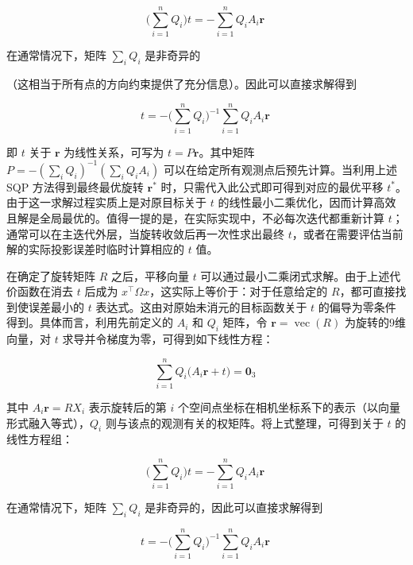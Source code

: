 \begin{equation} 
	\Big(\sum_{i=1}^n Q_i\Big)  t = - \sum_{i=1}^n Q_i A_i \mathbf{r}~
\end{equation}

在通常情况下，矩阵 $\sum_i Q_i$ 是非奇异的​

（这相当于所有点的方向约束提供了充分信息）。因此可以直接求解得到

\begin{equation} 
	t = -\Big(\sum_{i=1}^n Q_i\Big)^{-1} \sum_{i=1}^n Q_i A_i \mathbf{r}~  
\end{equation}

即 $t$ 关于 $\mathbf{r}$ 为线性关系，可写为 $t = P \mathbf{r}$​。其中矩阵 $P = -(\sum_i Q_i)^{-1}(\sum_i Q_i A_i)$ 可以在给定所有观测点后预先计算。当利用上述 SQP 方法得到最终最优旋转 $\mathbf{r}^*$ 时，只需代入此公式即可得到对应的最优平移 $t^*$。由于这一求解过程实质上是对原目标关于 $t$ 的线性最小二乘优化，因而计算高效且解是全局最优的。值得一提的是，在实际实现中，不必每次迭代都重新计算 $t$；通常可以在主迭代外层，当旋转收敛后再一次性求出最终 $t$，或者在需要评估当前解的实际投影误差时临时计算相应的 $t$ 值。

在确定了旋转矩阵 $R$ 之后，平移向量 $t$ 可以通过最小二乘闭式求解。由于上述代价函数在消去 $t$ 后成为 $x^\top \Omega x$，这实际上等价于：对于任意给定的 $R$，都可直接找到使误差最小的 $t$ 表达式。这由对原始未消元的目标函数关于 $t$ 的偏导为零条件得到。具体而言，利用先前定义的 $A_i$ 和 $Q_i$ 矩阵，令 $\mathbf{r} = \operatorname{vec}(R)$ 为旋转的9维向量，对 $t$ 求导并令梯度为零，可得到如下线性方程：

\begin{equation}
	\sum_{i=1}^n Q_i  \big(A_i \mathbf{r} + t\big) = \mathbf{0}_3~
\end{equation}

其中 $A_i   \mathbf{r} = R X_i$ 表示旋转后的第 $i$ 个空间点坐标在相机坐标系下的表示（以向量形式融入等式），$Q_i$ 则与该点的观测有关的权矩阵。将上式整理，可得到关于 $t$ 的线性方程组：

\begin{equation}
	\Big(\sum_{i=1}^n Q_i\Big) t  = - \sum_{i=1}^n Q_i A_i \mathbf{r}~
\end{equation}

在通常情况下，矩阵 $\sum_i Q_i$ 是非奇异的，因此可以直接求解得到

\begin{equation}
	t  = - \Big(\sum_{i=1}^n Q_i\Big)^{-1} \sum_{i=1}^n Q_i A_i \mathbf{r}~
\end{equation}

